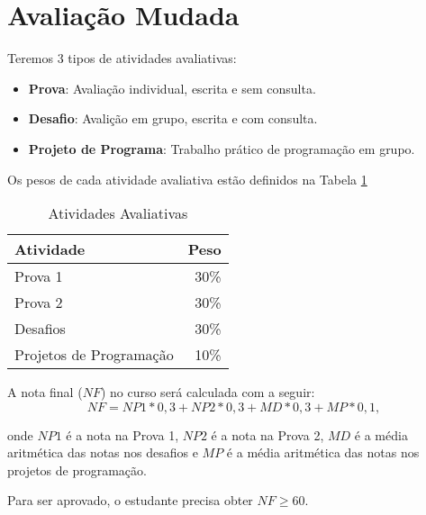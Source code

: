 \chapter*{Avalia\c{c}\~ao Mudada}

Teremos 3 tipos de atividades avaliativas:

\begin{itemize}
\item \textbf{Prova}: Avalia\c{c}\~ao individual, escrita e sem consulta.
\item \textbf{Desafio}: Avali\c{c}\~ao em grupo, escrita e com consulta.
\item \textbf{Projeto de Programa}: Trabalho pr\'atico de programa\c{c}\~ao em grupo.
\end{itemize}

Os pesos de cada atividade avaliativa est\~ao definidos na Tabela \ref{tab:avaliacao}

\begin{table}[htdp]
\caption{Atividades Avaliativas}
\begin{center}
\begin{tabular}{lr}
\hline
\textbf{Atividade} & \textbf{Peso} \\
\hline
Prova 1 & 30\% \\
\hline
Prova 2 & 30\% \\
\hline
Desafios & 30\% \\
\hline
Projetos de Programa\c{c}\~ao & 10\% \\
\hline
\end{tabular}
\end{center}
\label{tab:avaliacao}
\end{table}%

A nota final ($NF$) no curso ser\'a calculada com a seguir:
\begin{equation}
NF = NP1 * 0,3 +  NP2 * 0,3 +  MD * 0,3 + MP * 0,1,
\end{equation}

onde $NP1$ \'e a nota na Prova 1, $NP2$ \'e a nota na Prova 2, $MD$ \'e a m\'edia aritm\'etica das notas nos desafios e $MP$ \'e a m\'edia aritm\'etica das notas nos projetos de programa\c{c}\~ao.

Para ser aprovado, o estudante precisa obter $NF \geq 60$.
